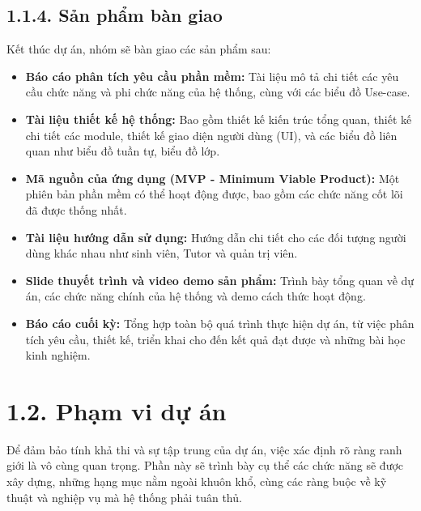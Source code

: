 \subsection*{1.1.4. Sản phẩm bàn giao}
Kết thúc dự án, nhóm sẽ bàn giao các sản phẩm sau:
\begin{itemize}
    \item \textbf{Báo cáo phân tích yêu cầu phần mềm:} Tài liệu mô tả chi tiết các yêu cầu chức năng và phi chức năng của hệ thống, cùng với các biểu đồ Use-case.
    \item \textbf{Tài liệu thiết kế hệ thống:}  Bao gồm thiết kế kiến trúc tổng quan, thiết kế chi tiết các module, thiết kế giao diện người dùng (UI), và các biểu đồ liên quan như biểu đồ tuần tự, biểu đồ lớp.
    \item \textbf{Mã nguồn của ứng dụng (MVP - Minimum Viable Product):} Một phiên bản phần mềm có thể hoạt động được, bao gồm các chức năng cốt lõi đã được thống nhất.
    \item \textbf{Tài liệu hướng dẫn sử dụng:} Hướng dẫn chi tiết cho các đối tượng người dùng khác nhau như sinh viên, Tutor và quản trị viên.
    \item \textbf{Slide thuyết trình và video demo sản phẩm:} Trình bày tổng quan về dự án, các chức năng chính của hệ thống và demo cách thức hoạt động.
    \item \textbf{Báo cáo cuối kỳ:} Tổng hợp toàn bộ quá trình thực hiện dự án, từ việc phân tích yêu cầu, thiết kế, triển khai cho đến kết quả đạt được và những bài học kinh nghiệm.
\end{itemize}


\section*{1.2. Phạm vi dự án}
Để đảm bảo tính khả thi và sự tập trung của dự án, việc xác định rõ ràng ranh giới là vô cùng quan trọng. Phần này sẽ trình bày cụ thể các chức năng sẽ được xây dựng, những hạng mục nằm ngoài khuôn khổ, cùng các ràng buộc về kỹ thuật và nghiệp vụ mà hệ thống phải tuân thủ.



